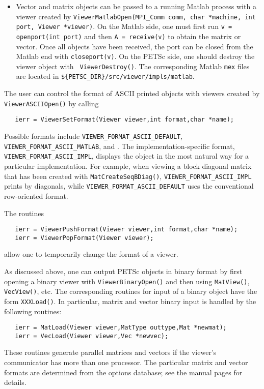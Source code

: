 {\begin{itemize}
      {\tt ViewerBinaryOpen(MPI\_Comm comm,char* file,ViewerBinaryType type,
      Viewer *viewer)}.   Details of binary
      I/O are discussed below.
\item Vector and matrix objects can be passed to a running Matlab process
      with a viewer created by {\tt ViewerMatlabOpen(MPI\_Comm comm,
      char *machine, int port, Viewer *viewer)}.  
      On the Matlab side, one must first run {\tt v = openport(int port)}
      and then {\tt A = receive(v)} to obtain the matrix or vector. Once all
      objects have been received, the port can be closed from the Matlab end
      with {\tt closeport(v)}. On the PETSc side, one should destroy
      the viewer object with  {\tt
      ViewerDestroy()}. The corresponding Matlab {\tt mex}
      files are located in {\tt \$\{PETSC\_DIR\}/src/viewer/impls/matlab}.
\end{itemize}

The user can control the format of ASCII printed objects with viewers 
created by {\tt ViewerASCIIOpen()} by calling
\begin{verbatim}
   ierr = ViewerSetFormat(Viewer viewer,int format,char *name);
\end{verbatim}  
  
 
Possible formats include 
{\tt VIEWER\_FORMAT\_ASCII\_DEFAULT}, {\tt VIEWER\_FORMAT\_ASCII\_MATLAB}, and
.  The implementation-specific format, 
{\tt VIEWER\_FORMAT\_ASCII\_IMPL}, displays the object in the most natural way
for a particular implementation.  For example, when viewing a block 
diagonal matrix that has been created with {\tt MatCreateSeqBDiag()},
{\tt VIEWER\_FORMAT\_ASCII\_IMPL} prints by diagonals, while {\tt VIEWER\_FORMAT\_ASCII\_DEFAULT}
uses the conventional row-oriented format.

The routines
\begin{verbatim}
   ierr = ViewerPushFormat(Viewer viewer,int format,char *name);
   ierr = ViewerPopFormat(Viewer viewer);
\end{verbatim} 
allow one to temporarily change the format of a viewer.
 

As discussed above, one can output PETSc objects in binary format by
first opening a binary viewer with {\tt ViewerBinaryOpen()} and
then using {\tt MatView()}, {\tt VecView()}, etc.  The corresponding
routines for input of a binary object have the form {\tt XXXLoad()}.  In
particular, matrix and vector binary input is handled by the
following routines:  
\begin{verbatim}
   ierr = MatLoad(Viewer viewer,MatType outtype,Mat *newmat);
   ierr = VecLoad(Viewer viewer,Vec *newvec);
\end{verbatim}
These routines generate parallel matrices and vectors if the viewer's
communicator has more than one processor.  The particular matrix and
vector formats are determined from the options database; see the
manual pages for details.

}
